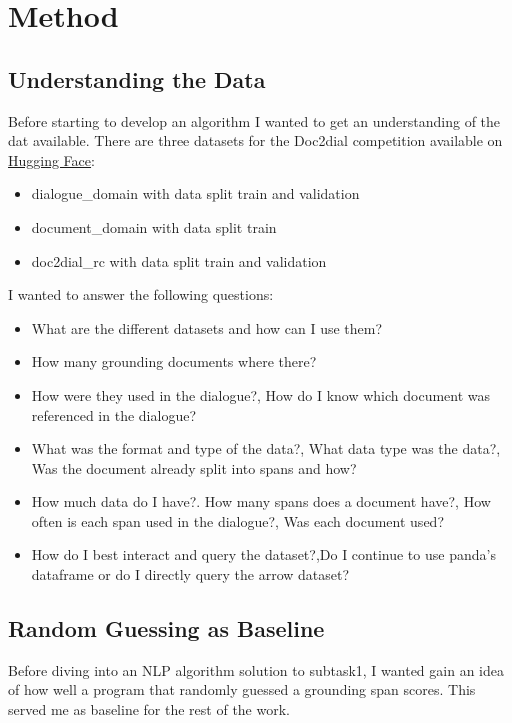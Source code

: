 \documentclass[11pt]{article}
\begin{document}
    \section{Method}\label{sec:method}

    \subsection{Understanding the Data}\label{subsec:understanding-the-data-method}
    Before starting to develop an algorithm I wanted to get an understanding of the dat available.
    There are three datasets for the Doc2dial competition available on \href{https://huggingface.co/datasets/doc2dial}{Hugging Face}:
    \begin{itemize}
        \item dialogue\_domain with data split train and validation
        \item document\_domain with data split train
        \item doc2dial\_rc with data split train and validation
    \end{itemize}

    I wanted to answer the following questions:
    \begin{itemize}
        \item What are the different datasets and how can I use them?
        \item How many grounding documents where there?
        \item How were they used in the dialogue?, How do I know which document was referenced in the dialogue?
        \item What was the format and type of the data?, What data type was the data?,
        Was the document already split into spans and how?
        \item How much data do I have?. How many spans does a document have?, How often is each span used in the dialogue?,
        Was each document used?
        \item How do I best interact and query the dataset?,Do I continue to use panda's dataframe or do I directly query
        the arrow dataset?
    \end{itemize}

    \subsection{Random Guessing as Baseline}\label{subsec:random-guessing-method}
    Before diving into an NLP algorithm solution to subtask1, I wanted gain an idea of how well a program that randomly guessed a
    grounding span scores. This served me as baseline for the rest of the work.
\end{document}
